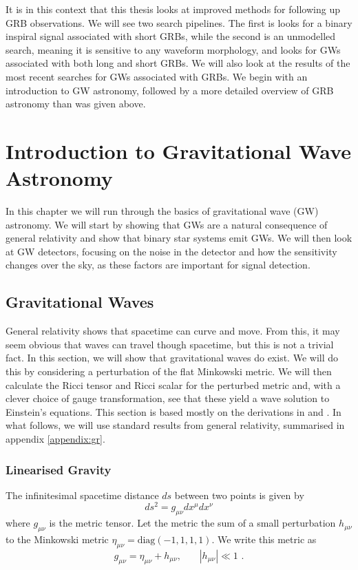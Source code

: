 \documentclass[11pt]{cuthesis}
\newcommand{\mn}{_{\mu\nu}}
\begin{document}
It is in this context that this thesis looks at improved methods for following up GRB observations. We will see two search pipelines. The first is looks for a binary inspiral signal associated with short GRBs, while the second is an unmodelled search, meaning it is sensitive to any waveform morphology, and looks for GWs associated with both long and short GRBs. We will also look at the results of the most recent searches for GWs associated with GRBs. We begin with an introduction to GW astronomy, followed by a more detailed overview of GRB astronomy than was given above. 


\chapter{Introduction to Gravitational Wave Astronomy} \label{chap: gw bg}
In this chapter we will run through the basics of gravitational wave (GW) astronomy. We will start by showing that GWs are a natural consequence of general relativity and show that binary star systems emit GWs. We will then look at GW detectors, focusing on the noise in the detector and how the sensitivity changes over the sky, as these factors are important for signal detection.


\section{Gravitational Waves}
General relativity shows that spacetime can curve and move. From this, it may seem obvious that waves can travel though spacetime, but this is not a trivial fact. In this section, we will show that gravitational waves do exist. We will do this by considering a perturbation of the flat Minkowski metric. We will then calculate the Ricci tensor and Ricci scalar for the perturbed metric and, with a clever choice of gauge transformation, see that these yield a wave solution to Einstein's equations. This section is based mostly on the derivations in \cite{zee-einstein} and \cite{carroll-spacetime}. In what follows, we will use standard results from general relativity, summarised in appendix \ref{appendix:gr}.

\subsection{Linearised Gravity}
The infinitesimal spacetime distance $ds$ between two points is given by
\begin{equation}
ds^2 = g\mn dx^\mu dx^\nu
\end{equation}  
where $g\mn$ is the metric tensor. Let the metric the sum of a small perturbation $h_{\mu\nu}$ to the Minkowski metric $\eta\mn=\text{diag}(-1,1,1,1)$. We write this metric as 
\begin{equation} \label{pert metric}
g\mn=\eta_{\mu\nu}+h_{\mu\nu} \text{, } \hspace{20pt} |h_{\mu\nu}| \ll 1 \text{ .}
\end{equation}
\end{document}
